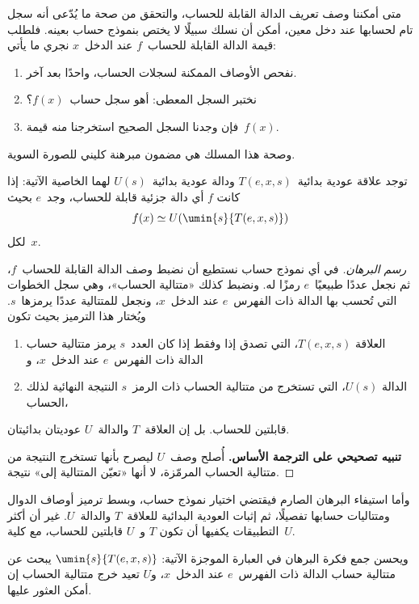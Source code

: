 \documentclass[../../../include/open-logic-section]{subfiles}
\begin{document}

متى أمكننا وصف تعريف الدالة القابلة للحساب، والتحقق من صحة ما يُدّعى أنه
سجل تام لحسابها عند دخل معين، أمكن أن نسلك سبيلًا لا يختص
بنموذج حساب بعينه. فلطلب قيمة
الدالة القابلة للحساب~$f$ عند الدخل~$x$ نجري ما يأتي:
\begin{enumerate}
  \item نفحص الأوصاف الممكنة لسجلات الحساب، واحدًا بعد آخر.
  \item نختبر السجل المعطى: أهو سجل حساب~$f(x)$؟
  \item فإن وجدنا السجل الصحيح استخرجنا منه قيمة~$f(x)$.
\end{enumerate}
وصحة هذا المسلك هي مضمون مبرهنة كليني للصورة السوية.

\begin{thm}
توجد علاقة عودية بدائية~$T(e,x,s)$ ودالة عودية بدائية~$U(s)$ لهما
الخاصية الآتية: إذا كانت $f$ أي دالة جزئية قابلة للحساب، وجد~$e$ بحيث
\[
f(x) \simeq U(\umin{s}{T(e, x, s)})
\]
لكل~$x$.
\end{thm}

\begin{proof}[رسم البرهان]
في أي نموذج حساب نستطيع أن نضبط وصف الدالة القابلة
للحساب~$f$، ثم نجعل عددًا طبيعيًا~$e$ رمزًا له. ونضبط كذلك
«متتالية الحساب»، وهي سجل الخطوات التي تُحسب بها الدالة ذات
الفهرس~$e$ عند الدخل~$x$، ونجعل للمتتالية عددًا يرمزها~$s$.
ويُختار هذا الترميز بحيث تكون
\begin{enumerate}
  \item العلاقة $T(e,x,s)$، التي تصدق إذا وفقط إذا كان العدد~$s$
  يرمز متتالية حساب الدالة ذات الفهرس~$e$ عند الدخل~$x$، و
  \item الدالة $U(s)$، التي تستخرج من متتالية الحساب ذات الرمز~$s$
  النتيجة النهائية لذلك الحساب،
\end{enumerate}
قابلتين للحساب. بل إن العلاقة~$T$ والدالة~$U$ عوديتان بدائيتان.

\textbf{تنبيه تصحيحي على الترجمة الأساس.} أُصلح وصف~$U$ ليصرح بأنها
تستخرج النتيجة من متتالية الحساب المرمّزة، لا أنها «تعيّن المتتالية إلى»
نتيجة.
\end{proof}

\begin{explain}
وأما استيفاء البرهان الصارم فيقتضي اختيار نموذج حساب، وبسط
ترميز أوصاف الدوال ومتتاليات حسابها تفصيلًا، ثم إثبات
العودية البدائية للعلاقة~$T$ والدالة~$U$. غير أن أكثر التطبيقات يكفيها
أن تكون $T$ و~$U$ قابلتين للحساب، مع كلية~$U$.

ويحسن جمع فكرة البرهان في العبارة الموجزة الآتية:
$\umin{s}{T(e,x,s)}$ يبحث عن متتالية حساب الدالة ذات الفهرس~$e$ عند
الدخل~$x$، و$U$ تعيد خرج متتالية الحساب إن أمكن العثور عليها.
\end{explain}
\end{document}
